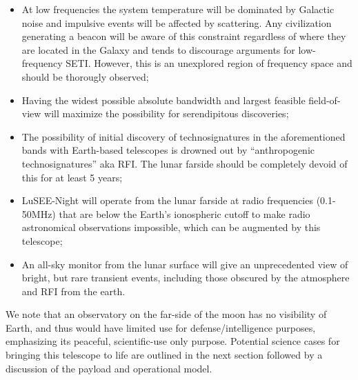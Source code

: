 \begin{itemize}
    \item At low frequencies the system temperature will be dominated by Galactic noise and impulsive events will be affected by scattering. Any civilization generating a beacon will be aware of this constraint regardless of where they are located in the Galaxy and tends to discourage arguments for low-frequency SETI.  However, this is an unexplored region of frequency space and should be thorougly observed;
    \item Having the widest possible absolute bandwidth and largest feasible field-of-view will maximize the possibility for serendipitous discoveries;
    \item The possibility of initial discovery of technosignatures in the aforementioned bands with Earth-based telescopes is drowned out by ``anthropogenic technosignatures” aka RFI.  The lunar farside should be completely devoid of this for at least 5 years;
   \item LuSEE-Night will operate from the lunar farside at radio frequencies (0.1-50MHz) that are below the Earth's ionospheric cutoff to make radio astronomical observations impossible, which can be augmented by this telescope;
    \item An all-sky monitor from the lunar surface will give an unprecedented view of bright, but rare transient events, including those obscured by the atmosphere and RFI from the earth.
\end{itemize}

We note that an observatory on the far-side of the moon has no visibility of Earth, and thus would have limited use for defense/intelligence purposes, emphasizing its peaceful, scientific-use only purpose. Potential science cases for bringing this telescope to life are outlined in the next section followed by a discussion of the payload and operational model.